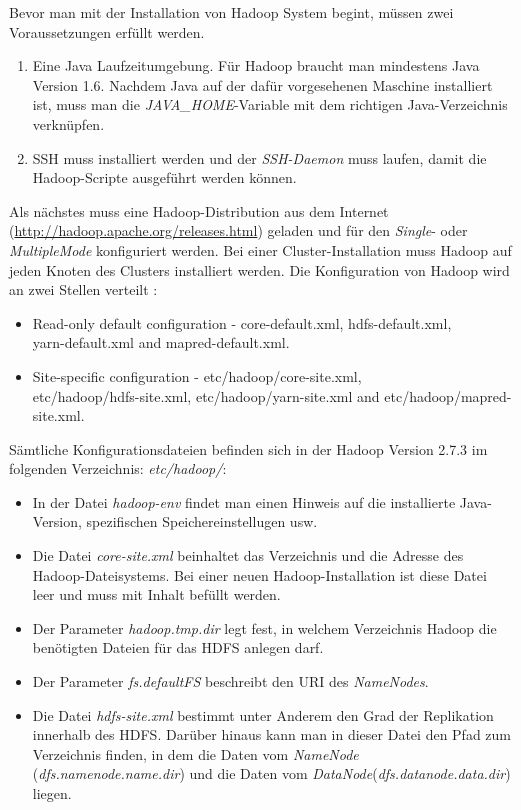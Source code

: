Bevor man mit der Installation von Hadoop System begint, müssen zwei Voraussetzungen erfüllt werden.
\begin{enumerate}
\item Eine Java Laufzeitumgebung. Für Hadoop braucht man mindestens Java Version 1.6.
Nachdem Java auf der dafür vorgesehenen Maschine installiert ist, muss man die \textit{JAVA\_HOME}-Variable mit dem richtigen Java-Verzeichnis verknüpfen.
\item \ac{SSH} muss installiert werden und der \textit{\ac{SSH}-Daemon} muss laufen, damit die Hadoop-Scripte ausgeführt werden können.
\end{enumerate}
Als nächstes muss eine Hadoop-Distribution aus dem Internet (\url{http://hadoop.apache.org/releases.html}) geladen und für den \textit{Single}- oder \textit{MultipleMode} konfiguriert werden. Bei einer Cluster-Installation muss Hadoop auf jeden Knoten des Clusters installiert werden.
Die Konfiguration von Hadoop wird an zwei Stellen verteilt \cite{hadoopConfiguration}:
\begin{itemize}
\item Read-only default configuration - core-default.xml, hdfs-default.xml, \\yarn-default.xml and mapred-default.xml.
\item Site-specific configuration - etc/hadoop/core-site.xml,\\ etc/hadoop/hdfs-site.xml, etc/hadoop/yarn-site.xml and etc/hadoop/mapred-site.xml.
\end{itemize}


Sämtliche Konfigurationsdateien befinden sich in der Hadoop Version 2.7.3 im folgenden Verzeichnis: \textit{etc/hadoop/}:
\begin{itemize}
\item In der Datei \textit{hadoop-env} findet man einen Hinweis auf die installierte Java-Version, spezifischen Speichereinstellugen usw. 
\item Die Datei \textit{core-site.xml} beinhaltet das Verzeichnis und die Adresse des Hadoop-Dateisystems. Bei einer neuen Hadoop-Installation ist diese Datei leer und muss mit Inhalt befüllt werden.
\item Der Parameter \textit{hadoop.tmp.dir} legt fest, in welchem Verzeichnis Hadoop die benötigten Dateien für das HDFS anlegen darf.
\item Der Parameter \textit{fs.defaultFS} beschreibt den \ac{URI} des \textit{NameNodes}.
\item Die Datei \textit{hdfs-site.xml} bestimmt unter Anderem den Grad der Replikation innerhalb des \ac{HDFS}. Darüber hinaus kann man in dieser Datei den Pfad zum Verzeichnis finden, in dem die Daten vom \textit{NameNode} (\textit{dfs.namenode.name.dir}) und die Daten vom \textit{DataNode}(\textit{dfs.datanode.data.dir}) liegen.
\end{itemize}

